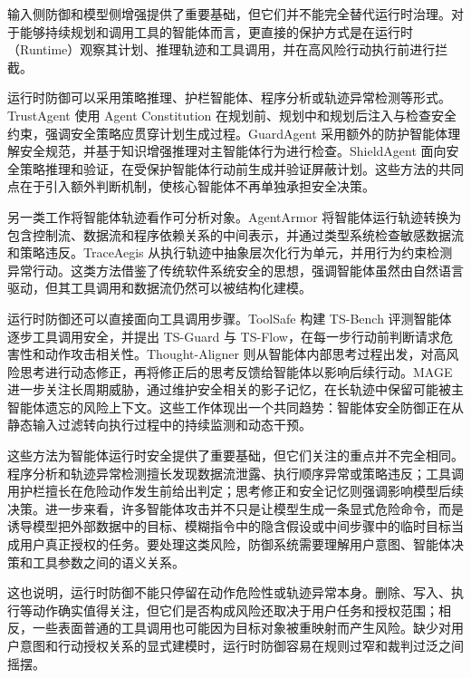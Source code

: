 输入侧防御和模型侧增强提供了重要基础，但它们并不能完全替代运行时治理。对于能够持续规划和调用工具的智能体而言，更直接的保护方式是在运行时（Runtime）观察其计划、推理轨迹和工具调用，并在高风险行动执行前进行拦截。

运行时防御可以采用策略推理、护栏智能体、程序分析或轨迹异常检测等形式。TrustAgent 使用 Agent Constitution 在规划前、规划中和规划后注入与检查安全约束，强调安全策略应贯穿计划生成过程\cite{hua2024trustagent}。GuardAgent 采用额外的防护智能体理解安全规范，并基于知识增强推理对主智能体行为进行检查\cite{xiang2024guardagent}。ShieldAgent 面向安全策略推理和验证，在受保护智能体行动前生成并验证屏蔽计划\cite{chen2025shieldagent}。这些方法的共同点在于引入额外判断机制，使核心智能体不再单独承担安全决策。

另一类工作将智能体轨迹看作可分析对象。AgentArmor 将智能体运行轨迹转换为包含控制流、数据流和程序依赖关系的中间表示，并通过类型系统检查敏感数据流和策略违反\cite{wang2025agentarmor}。TraceAegis 从执行轨迹中抽象层次化行为单元，并用行为约束检测异常行动\cite{liu2025traceaegis}。这类方法借鉴了传统软件系统安全的思想，强调智能体虽然由自然语言驱动，但其工具调用和数据流仍然可以被结构化建模。

运行时防御还可以直接面向工具调用步骤。ToolSafe 构建 TS-Bench 评测智能体逐步工具调用安全，并提出 TS-Guard 与 TS-Flow，在每一步行动前判断请求危害性和动作攻击相关性\cite{mou2026toolsafe}。Thought-Aligner 则从智能体内部思考过程出发，对高风险思考进行动态修正，再将修正后的思考反馈给智能体以影响后续行动\cite{jiang2025think}。MAGE 进一步关注长周期威胁，通过维护安全相关的影子记忆，在长轨迹中保留可能被主智能体遗忘的风险上下文\cite{wang2026mage}。这些工作体现出一个共同趋势：智能体安全防御正在从静态输入过滤转向执行过程中的持续监测和动态干预。

这些方法为智能体运行时安全提供了重要基础，但它们关注的重点并不完全相同。程序分析和轨迹异常检测擅长发现数据流泄露、执行顺序异常或策略违反；工具调用护栏擅长在危险动作发生前给出判定；思考修正和安全记忆则强调影响模型后续决策。进一步来看，许多智能体攻击并不只是让模型生成一条显式危险命令，而是诱导模型把外部数据中的目标、模糊指令中的隐含假设或中间步骤中的临时目标当成用户真正授权的任务。要处理这类风险，防御系统需要理解用户意图、智能体决策和工具参数之间的语义关系。

这也说明，运行时防御不能只停留在动作危险性或轨迹异常本身。删除、写入、执行等动作确实值得关注，但它们是否构成风险还取决于用户任务和授权范围；相反，一些表面普通的工具调用也可能因为目标对象被重映射而产生风险。缺少对用户意图和行动授权关系的显式建模时，运行时防御容易在规则过窄和裁判过泛之间摇摆。

